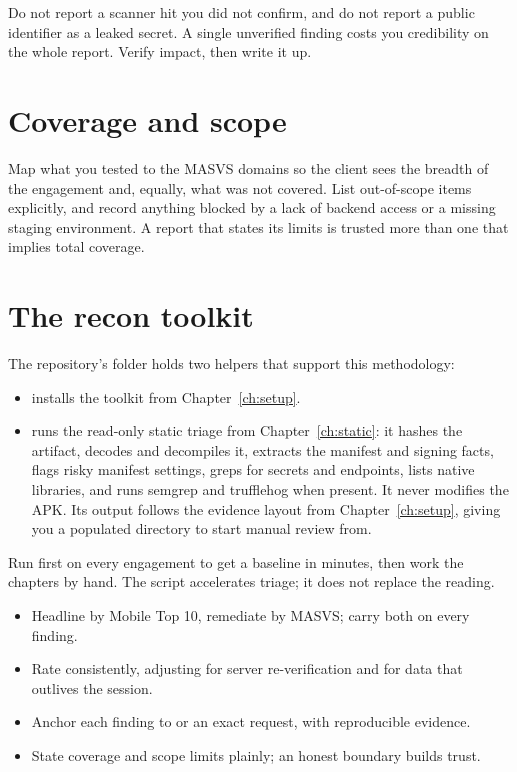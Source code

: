 \begin{trap}
Do not report a scanner hit you did not confirm, and do not report a public identifier as a leaked secret. A single unverified finding costs you credibility on the whole report. Verify impact, then write it up.
\end{trap}

\section{Coverage and scope}
Map what you tested to the MASVS domains so the client sees the breadth of the engagement and, equally, what was not covered. List out-of-scope items explicitly, and record anything blocked by a lack of backend access or a missing staging environment. A report that states its limits is trusted more than one that implies total coverage.

\section{The recon toolkit}
The repository's  folder holds two helpers that support this methodology:

\begin{itemize}
\item {} installs the toolkit from Chapter~\ref{ch:setup}.
\item {} runs the read-only static triage from Chapter~\ref{ch:static}: it hashes the artifact, decodes and decompiles it, extracts the manifest and signing facts, flags risky manifest settings, greps for secrets and endpoints, lists native libraries, and runs semgrep and trufflehog when present. It never modifies the APK. Its output follows the evidence layout from Chapter~\ref{ch:setup}, giving you a populated  directory to start manual review from.
\end{itemize}

Run  first on every engagement to get a baseline in minutes, then work the chapters by hand. The script accelerates triage; it does not replace the reading.

\begin{summarybox}
\begin{itemize}
\item Headline by Mobile Top 10, remediate by MASVS; carry both on every finding.
\item Rate consistently, adjusting for server re-verification and for data that outlives the session.
\item Anchor each finding to  or an exact request, with reproducible evidence.
\item State coverage and scope limits plainly; an honest boundary builds trust.
\end{itemize}
\end{summarybox}
